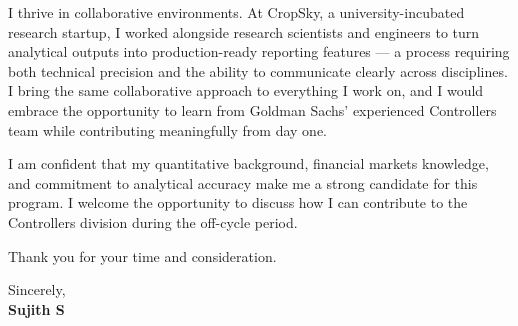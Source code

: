 \documentclass[a4paper,10pt]{article}
\begin{document}
{\vspace{9pt}

I thrive in collaborative environments. At CropSky, a university-incubated research startup, I worked alongside research scientists and engineers to turn analytical outputs into production-ready reporting features --- a process requiring both technical precision and the ability to communicate clearly across disciplines. I bring the same collaborative approach to everything I work on, and I would embrace the opportunity to learn from Goldman Sachs' experienced Controllers team while contributing meaningfully from day one.

\vspace{9pt}

I am confident that my quantitative background, financial markets knowledge, and commitment to analytical accuracy make me a strong candidate for this program. I welcome the opportunity to discuss how I can contribute to the Controllers division during the off-cycle period.

\vspace{9pt}

Thank you for your time and consideration.

}

\vspace{14pt}

{\fontsize{11}{14}\selectfont\color[HTML]{0A0A0A}
Sincerely, \\[18pt]
\textbf{Sujith S}}
\end{document}
